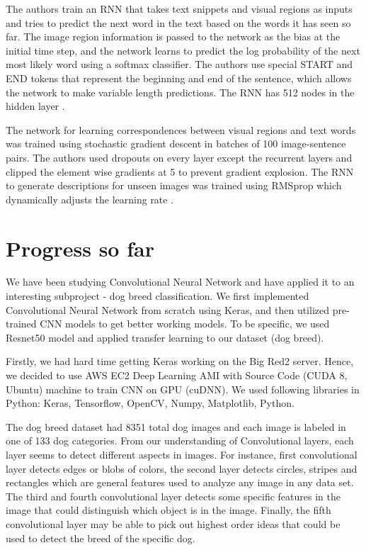 \documentclass[a4paper]{article}
\begin{document}
The authors train an RNN that takes text snippets and visual regions as inputs and tries to predict the next word in the text based on the words it has seen so far. The image region information is passed to the network as the bias at the initial time step, and the network learns to predict the log probability of the next most likely word using a softmax classifier. The authors use special START and END tokens that represent the beginning and end of the sentence, which allows the network to make variable length predictions. The RNN has 512 nodes in the hidden layer \cite{karpathy-deep-visial-semantic}.

The network for learning correspondences between visual regions and text words was trained using stochastic gradient descent in batches of 100 image-sentence pairs. The authors used dropouts on every layer except the recurrent layers and clipped the element wise gradients at 5 to prevent gradient explosion. The RNN to generate descriptions for unseen images was trained using RMSprop which dynamically adjusts the learning rate \cite{karpathy-deep-visial-semantic}.

\section{Progress so far}

We have been studying Convolutional Neural Network and have applied it to an interesting subproject - dog breed classification. We first implemented Convolutional Neural Network from scratch using Keras, and then utilized pre-trained CNN models to get better working models. To be specific, we used Resnet50 model and applied transfer learning to our dataset (dog breed).

Firstly, we had hard time getting Keras working on the Big Red2 server. Hence, we decided to use AWS EC2 Deep Learning AMI with Source Code (CUDA 8, Ubuntu) machine to train CNN on GPU (cuDNN). We used following libraries in Python: Keras, Tensorflow, OpenCV, Numpy, Matplotlib, Python.

The dog breed dataset had 8351 total dog images and each image is labeled in one of 133 dog categories. From our understanding of Convolutional layers, each layer seems to detect different aspects in images. For instance, first convolutional layer detects edges or blobs of colors, the second layer detects circles, stripes and rectangles which are general features used to analyze any image in any data set. The third and fourth convolutional layer detects some specific features in the image that could distinguish which object is in the image. Finally, the fifth convolutional layer may be able to pick out highest order ideas that could be used to detect the breed of the specific dog.
\end{document}
